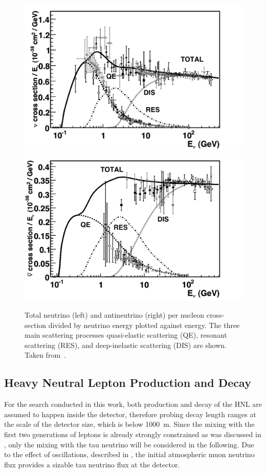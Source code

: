 \begin{figure}[h]
	\centering
    \includegraphics[width=0.495\linewidth]{figures/neutrinos_properties/cc_inclusive_nu.pdf}
    \includegraphics[width=0.495\linewidth]{figures/neutrinos_properties/cc_inclusive_nubar.pdf}
	\caption[Total inclusive neutrino-nucleon cross-sections]{Total neutrino (left) and antineutrino (right) per nucleon cross-section divided by neutrino energy plotted against energy.
    The three main scattering processes quasi-elastic scattering (QE), resonant scattering (RES), and deep-inelastic scattering (DIS) are shown. Taken from~\cite{Formaggio_Cross_Sections}.}
\end{figure}


\subsection{Heavy Neutral Lepton Production and Decay} 


For the search conducted in this work, both production and decay of the HNL are assumed to happen inside the detector, therefore probing decay length ranges at the scale of the detector size, which is below \SI{1000}{\meter}. Since the mixing with the first two generations of leptons is already strongly constrained as was discussed in , only the mixing with the tau neutrino will be considered in the following. Due to the effect of oscillations, described in , the initial atmospheric muon neutrino flux provides a sizable tau neutrino flux at the detector.

